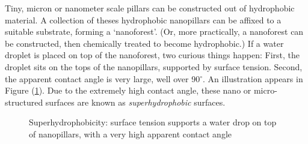 \documentclass[12pt, a4paper, twoside, openright]{book}
\begin{document}
Tiny, micron or nanometer scale pillars can be constructed out of hydrophobic material.  A collection of theses hydrophobic nanopillars can be affixed to a suitable substrate, forming a `nanoforest'.  (Or, more practically, a nanoforest can be constructed, then chemically treated to become hydrophobic.)  If a water droplet is placed on top of the nanoforest, two curious things happen:  First, the droplet sits on the tops of the nanopillars, supported by surface tension.  Second, the apparent contact angle is very large, well over 90$^{\circ}$.  An illustration appears in Figure (\ref{superhydrophobic}).  Due to the extremely high contact angle, these nano or micro-structured surfaces are known as \emph{superhydrophobic} surfaces.  

\begin{figure}[ht]
\centering
{}
\caption{Superhydrophobicity: surface tension supports a water drop on top of nanopillars, with a very high apparent contact angle}\label{superhydrophobic}
\end{figure}

  


%
%
%
%
%
\end{document}
